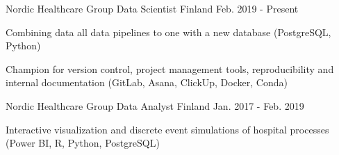 
\begin{cventries}


  \cventry
    {Nordic Healthcare Group} %
    {Data Scientist} %
    {Finland} %
    {Feb. 2019 - Present} %
    {
      \begin{cvitems} %
        \item {Combining data all data pipelines to one with a new database (PostgreSQL, Python)}
        \item {Champion for version control, project management tools, reproducibility and internal documentation (GitLab, Asana, ClickUp, Docker, Conda)}
      \end{cvitems}
    }

  \cventry
    {Nordic Healthcare Group} %
    {Data Analyst} %
    {Finland} %
    {Jan. 2017 - Feb. 2019} %
    {
      \begin{cvitems} %
        \item {Interactive visualization and discrete event simulations of hospital processes (Power BI, R, Python, PostgreSQL)}
      \end{cvitems}
    }


\end{cventries}
